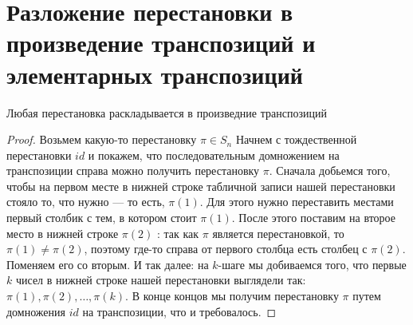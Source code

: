 \section{Разложение перестановки в произведение транспозиций и элементарных транспозиций}
\begin{theorem-non}
    Любая перестановка раскладывается в произведние транспозиций

    \begin{proof}
        Возьмем какую-то перестановку $\pi \in S_n$
        Начнем с тождественной перестановки $id$ и покажем, 
        что последовательным домножением на транспозиции справа можно получить 
        перестановку $\pi$. Сначала добьемся того, чтобы на первом месте в нижней строке 
        табличной записи нашей перестановки стояло то, что нужно — то есть, $\pi(1)$. 
        Для этого нужно переставить местами первый столбик с тем, в котором стоит $\pi(1)$.
        После этого поставим на второе место в нижней строке $\pi(2)$ : так как $\pi$ является 
        перестановкой, то $\pi(1) \neq \pi(2)$, поэтому где-то справа от первого столбца есть 
        столбец с $\pi(2)$. Поменяем его со вторым. И так далее: на $k$-шаге мы добиваемся того, 
        что первые $k$ чисел в нижней строке нашей перестановки выглядели так: $\pi(1), \pi(2), \dots, \pi(k)$.
        В конце концов мы получим перестановку $\pi$ путем домножения $id$ на транспозиции, что и требовалось.
    \end{proof}
\end{theorem-non}

